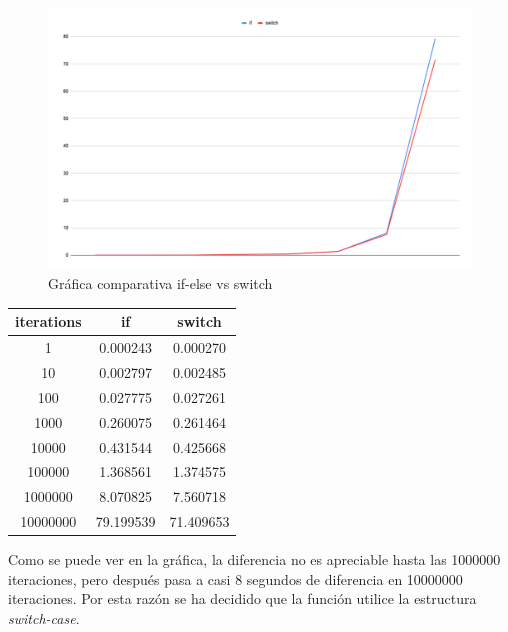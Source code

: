 \documentclass{article}
\begin{document}
            \begin{figure}[ht]
                \centering
                \includegraphics[width=\textwidth]{grafica_if_switch}
                \caption{Gráfica comparativa if-else vs switch}
            \end{figure}
            \begin{center}
                \begin{tabular}{ |c|c|c| }
                    \hline
                        iterations & if & switch \\
                        \hline\hline
                        1 & 0.000243 & 0.000270 \\
                        \hline
                        10 & 0.002797 & 0.002485 \\
                        \hline
                        100 & 0.027775 & 0.027261 \\
                        \hline
                        1000 & 0.260075 & 0.261464 \\
                        \hline
                        10000 & 0.431544 & 0.425668 \\
                        \hline
                        100000 & 1.368561 & 1.374575 \\
                        \hline
                        1000000 & 8.070825 & 7.560718 \\
                        \hline
                        10000000 & 79.199539 & 71.409653 \\
                    \hline
                \end{tabular}
            \end{center}

            Como se puede ver en la gráfica, la diferencia no es apreciable hasta las 1000000 iteraciones, pero después
            pasa a casi 8 segundos de diferencia en 10000000 iteraciones. Por esta razón se ha decidido que la función
            utilice la estructura \textit{switch-case}.\newline
\end{document}
